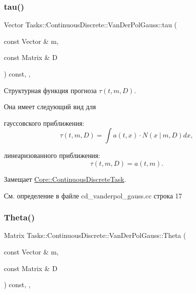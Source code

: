 \subsubsection{\texorpdfstring{tau()}{tau()}}
{\footnotesize\ttfamily Vector Tasks\+::\+Continuous\+Discrete\+::\+Van\+Der\+Pol\+Gauss\+::tau (\begin{DoxyParamCaption}\item[{const Vector \&}]{m,  }\item[{const Matrix \&}]{D }\end{DoxyParamCaption}) const\hspace{0.3cm}{\ttfamily [override]}, {\ttfamily [protected]}, {\ttfamily [virtual]}}



Структурная функция прогноза $\tau(t, m, D)$. 

Она имеет следующий вид для


\begin{DoxyItemize}
\item гауссовского приближения\+: \[\tau(t, m, D) = \int a(t,x)\cdot N(x\ |\ m, D)dx,\]
\item линеаризованного приближения\+: \[\tau(t, m, D) = a(t, m).\] 
\end{DoxyItemize}

Замещает \hyperlink{class_core_1_1_continuous_discrete_task_a491a9dc4463031a6f5f2eeda24d8ba9c}{Core\+::\+Continuous\+Discrete\+Task}.



См. определение в файле cd\+\_\+vanderpol\+\_\+gauss.\+cc строка 17

\hypertarget{class_tasks_1_1_continuous_discrete_1_1_van_der_pol_gauss_addb8066d1f4701c0c453d07ffa8631ff}{}\label{class_tasks_1_1_continuous_discrete_1_1_van_der_pol_gauss_addb8066d1f4701c0c453d07ffa8631ff} 
\subsubsection{\texorpdfstring{Theta()}{Theta()}}
{\footnotesize\ttfamily Matrix Tasks\+::\+Continuous\+Discrete\+::\+Van\+Der\+Pol\+Gauss\+::\+Theta (\begin{DoxyParamCaption}\item[{const Vector \&}]{m,  }\item[{const Matrix \&}]{D }\end{DoxyParamCaption}) const\hspace{0.3cm}{\ttfamily [override]}, {\ttfamily [protected]}, {\ttfamily [virtual]}}



